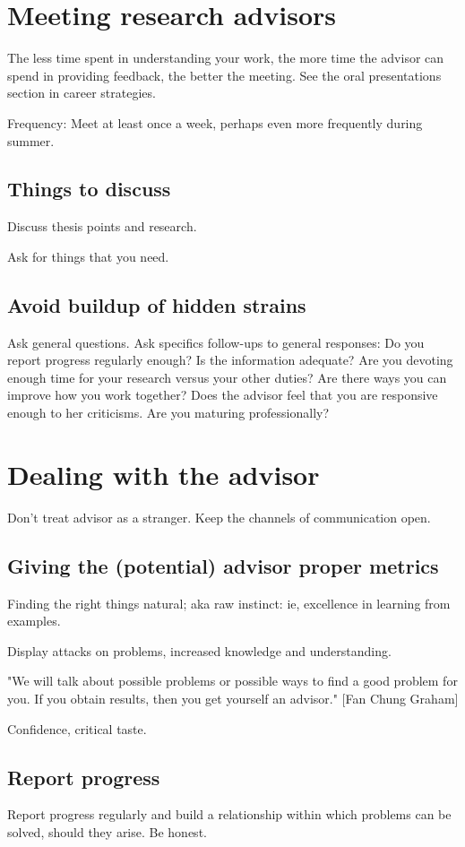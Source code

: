 \documentclass[oneside, article]{memoir}
\begin{document}
\section{Meeting research advisors}
The less time spent in understanding your work, the more time the advisor can spend in providing feedback, the better the meeting. See the oral presentations section in career strategies.

Frequency: Meet at least once a week, perhaps even more frequently during summer.

\subsection{Things to discuss}
Discuss thesis points and research.

Ask for things that you need.

\subsection{Avoid buildup of hidden strains}
Ask general questions. Ask specifics follow-ups to general responses:
\subitem Do you report progress regularly enough? Is the information adequate?
\subitem Are you devoting enough time for your research versus your other duties?
\subitem Are there ways you can improve how you work together? Does the advisor feel that you are responsive enough to her criticisms.
\subitem Are you maturing professionally?

\section{Dealing with the advisor}
Don't treat advisor as a stranger. Keep the channels of communication open.


\subsection{Giving the (potential) advisor proper metrics}
Finding the right things natural; aka raw instinct: ie, excellence in learning from examples.

Display attacks on problems, increased knowledge and understanding.

"We will talk about possible problems or possible ways to find a good problem for you. If you obtain results, then you get yourself an advisor." [Fan Chung Graham]

Confidence, critical taste.

\subsection{Report progress}
Report progress regularly and build a relationship within which problems can be solved, should they arise. Be honest.
\end{document}
